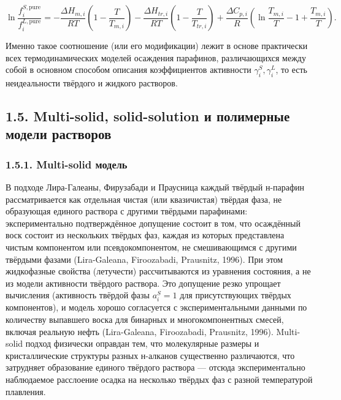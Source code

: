 \documentclass[11pt]{extarticle}
\begin{document}
\[
\ln\frac{f_i^{S,\text{pure}}}{f_i^{L,\text{pure}}} = -\frac{\Delta H_{m,i}}{RT}\left(1-\frac{T}{T_{m,i}}\right) - \frac{\Delta H_{tr,i}}{RT}\left(1-\frac{T}{T_{tr,i}}\right) + \frac{\Delta C_{p,i}}{R}\left(\ln\frac{T_{m,i}}{T} - 1 + \frac{T_{m,i}}{T}\right).
\]

Именно такое соотношение (или его модификации) лежит в основе практически всех термодинамических моделей осаждения парафинов, различающихся между собой в основном способом описания коэффициентов активности \(\gamma_i^{S}, \gamma_i^{L}\), то есть неидеальности твёрдого и жидкого растворов.

\subsection{1.5. Multi-solid, solid-solution и полимерные модели растворов}\label{multi-solid-solid-solution-ux438-ux43fux43eux43bux438ux43cux435ux440ux43dux44bux435-ux43cux43eux434ux435ux43bux438-ux440ux430ux441ux442ux432ux43eux440ux43eux432}

\subsubsection{1.5.1. Multi-solid модель}\label{multi-solid-ux43cux43eux434ux435ux43bux44c}

В подходе Лира-Галеаны, Фирузабади и Праусница каждый твёрдый н-парафин рассматривается как отдельная чистая (или квазичистая) твёрдая фаза, не образующая единого раствора с другими твёрдыми парафинами: экспериментально подтверждённое допущение состоит в том, что осаждённый воск состоит из нескольких твёрдых фаз, каждая из которых представлена чистым компонентом или псевдокомпонентом, не смешивающимся с другими твёрдыми фазами (Lira-Galeana, Firoozabadi, Prausnitz, 1996). При этом жидкофазные свойства (летучести) рассчитываются из уравнения состояния, а не из модели активности твёрдого раствора. Это допущение резко упрощает вычисления (активность твёрдой фазы \(a_i^S = 1\) для присутствующих твёрдых компонентов), и модель хорошо согласуется с экспериментальными данными по количеству выпавшего воска для бинарных и многокомпонентных смесей, включая реальную нефть (Lira-Galeana, Firoozabadi, Prausnitz, 1996). Multi-solid подход физически оправдан тем, что молекулярные размеры и кристаллические структуры разных н-алканов существенно различаются, что затрудняет образование единого твёрдого раствора --- отсюда экспериментально наблюдаемое расслоение осадка на несколько твёрдых фаз с разной температурой плавления.
\end{document}
